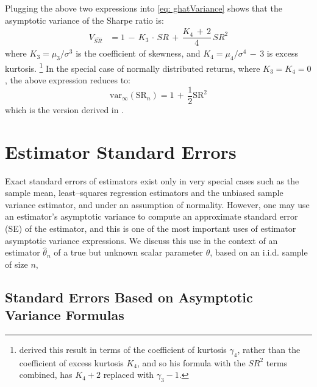 \documentclass[graybox,envcountchap,sectrefs]{svmono}\usepackage[]{graphicx}\usepackage[]{xcolor}
\begin{document}
\begin{appendices}
Plugging the above two expressions into \eqref{eq: ghatVariance}
shows that the asymptotic variance of the Sharpe ratio is:
\begin{align}
V_{\widehat{SR}} & =1\,-\,K_{3}\,\cdot\,SR\,+\,\dfrac{K_{4}\,+\,2}{4}\,{SR}^{2}\label{eq: asympVarianceSR}
\end{align}
where $K_{3}=\mu_{3}/\sigma^{3}$ is the coefficient of skewness,
and $K_{4}=\mu_{4}/\sigma^{4}\,-\,3$ is excess kurtosis. \footnote{\citet{Mertens2002}derived this result in terms of the coefficient
of kurtosis $\gamma_{4}$, rather than the coefficient of excess kurtosis
$K_{4}$, and so his formula with the ${SR}^{2}$ terms combined,
has $K_{4}+2$ replaced with $\gamma_{3}-1$.} In the special case of normally distributed returns, where $K_{3}=K_{4}=0$,
the above expression reduces to:
\begin{equation}
\mathrm{var}_{\infty}\left({\mathrm{SR}}_{n}\right)=1\,+\,\dfrac{1}{2}{\mathrm{SR}}^{2}\label{eq:asympVarianceSRnormalReturnsAppendixB}
\end{equation}
which is the version derived in \citet{Lo2002}.

\section{Estimator Standard Errors}

Exact standard errors of estimators exist only in very special cases
such as the sample mean, least--squares regression estimators and
the unbiased sample variance estimator, and under an assumption of
normality. However, one may use an estimator's asymptotic variance
to compute an approximate standard error (SE) of the estimator, and
this is one of the most important uses of estimator asymptotic variance
expressions. We discuss this use in the context of an estimator $\hat{\theta}_{n}$
of a true but unknown scalar parameter $\theta$, based on an i.i.d.
sample of size $n$,

\subsection{Standard Errors Based on Asymptotic Variance Formulas}


\end{appendices}
\end{document}
